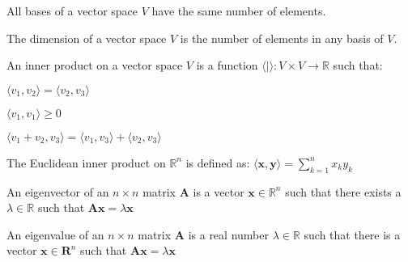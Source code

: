 \documentclass[crop=false,class=book,oneside]{standalone}
\begin{document}
            \begin{theorem*}
                All bases of a vector space $V$ have the
                same number of elements.
            \end{theorem*}
            \begin{definition}
                The dimension of a vector space
                $V$ is the number of elements in any
                basis of $V$.
            \end{definition}
            \begin{definition}
                An inner product on a vector space $V$ is a function
                $\langle|\rangle:{V}\times{V}\rightarrow\mathbb{R}$
                such that:
                \begin{enumerate}
                    \begin{multicols}{3}
                        \item $\langle{v_{1},v_{2}}\rangle%
                               =\langle{v_{2},v_{3}}\rangle$
                        \item $\langle{v_{1},v_{1}}\rangle\geq{0}$
                        \item $\langle{v_{1}+v_{2},v_{3}}\rangle%
                               =\langle{v_{1},v_{3}}\rangle%
                               +\langle{v_{2},v_{3}}\rangle$
                    \end{multicols}
                \end{enumerate}
            \end{definition}
            \begin{definition}
                The Euclidean inner product on $\mathbb{R}^{n}$
                is defined as:
                $\langle{\mathbf{x},\mathbf{y}}\rangle%
                 =\sum_{k=1}^{n}x_{k}y_{k}$
            \end{definition}
            \begin{definition}
                An eigenvector of an ${n}\times{n}$ matrix
                $\mathbf{A}$ is a vector
                $\mathbf{x}\in\mathbb{R}^{n}$
                such that there exists a $\lambda\in\mathbb{R}$
                such that
                $\mathbf{A}\mathbf{x}=\lambda\mathbf{x}$
            \end{definition}
            \begin{definition}
                An eigenvalue of an ${n}\times{n}$ matrix
                $\mathbf{A}$ is a real number
                $\lambda\in\mathbb{R}$ such that there is
                a vector $\mathbf{x}\in\mathbf{R}^{n}$ such
                that $\mathbf{A}\mathbf{x}=\lambda\mathbf{x}$
            \end{definition}
\end{document}
